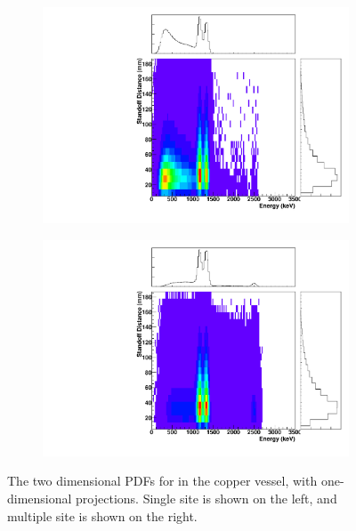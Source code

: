 \documentclass[herrin-thesis.tex]{subfiles}
\begin{document}
\begin{figure}[hp]
\centering
	\begin{subfigure}[b]{0.48\textwidth}
	\centering
	\includegraphics[width=\textwidth]{./plots/PDFs/analysis_pdf_AllVessel_Co60_ss.pdf}
\end{subfigure}\hfill%
\begin{subfigure}[b]{0.48\textwidth}
	\centering
	\includegraphics[width=1\textwidth]{./plots/PDFs/analysis_pdf_AllVessel_Co60_ms.pdf}
	\end{subfigure}
\caption[PDF for  in the TPC vessel]{The two dimensional PDFs for  in the copper vessel, with one-dimensional projections. Single site is shown on the left, and multiple site is shown on the right.}
\label{fig:analysis_pdf_AllVessel_Co60}
\end{figure}
\end{document}
